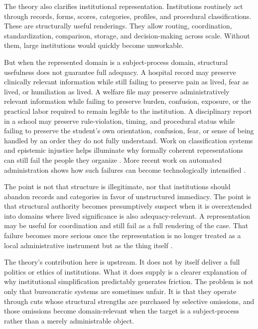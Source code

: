 \documentclass[11pt]{article}
\begin{document}
The theory also clarifies institutional representation. Institutions routinely act through records, forms, scores, categories, profiles, and procedural classifications. These are structurally useful renderings. They allow routing, coordination, standardization, comparison, storage, and decision-making across scale. Without them, large institutions would quickly become unworkable.

But when the represented domain is a subject-process domain, structural usefulness does not guarantee full adequacy. A hospital record may preserve clinically relevant information while still failing to preserve pain as lived, fear as lived, or humiliation as lived. A welfare file may preserve administratively relevant information while failing to preserve burden, confusion, exposure, or the practical labor required to remain legible to the institution. A disciplinary report in a school may preserve rule-violation, timing, and procedural status while failing to preserve the student's own orientation, confusion, fear, or sense of being handled by an order they do not fully understand. Work on classification systems and epistemic injustice helps illuminate why formally coherent representations can still fail the people they organize \cite{BowkerStar1999,Fricker2007}. More recent work on automated administration shows how such failures can become technologically intensified \cite{Eubanks2018}.

The point is not that structure is illegitimate, nor that institutions should abandon records and categories in favor of unstructured immediacy. The point is that structural authority becomes presumptively suspect when it is overextended into domains where lived significance is also adequacy-relevant. A representation may be useful for coordination and still fail as a full rendering of the case. That failure becomes more serious once the representation is no longer treated as a local administrative instrument but as the thing itself \cite{BowkerStar1999,Fricker2007}.

The theory's contribution here is upstream. It does not by itself deliver a full politics or ethics of institutions. What it does supply is a clearer explanation of why institutional simplification predictably generates friction. The problem is not only that bureaucratic systems are sometimes unfair. It is that they operate through cuts whose structural strengths are purchased by selective omissions, and those omissions become domain-relevant when the target is a subject-process rather than a merely administrable object.
\end{document}
